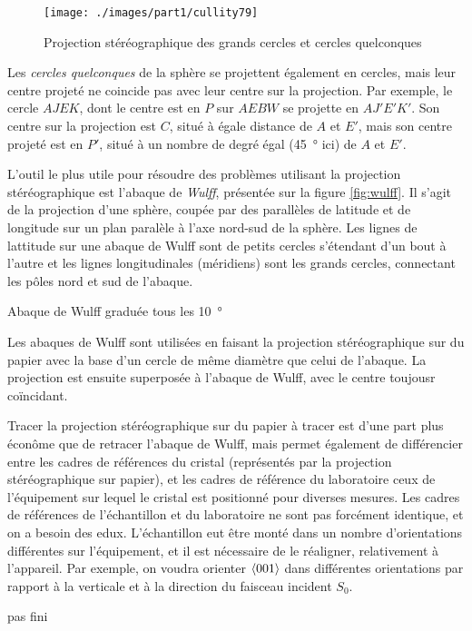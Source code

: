 \begin{figure*}[t]
    \texttt{[image: ./images/part1/cullity79]}
    \caption{Projection stéréographique des grands cercles et cercles quelconques}
    \label{fig:stereocercles}
\end{figure*}

Les \emph{cercles quelconques} de la sphère se projettent également en cercles, mais leur centre projeté ne coincide pas avec leur centre sur la projection. Par exemple, le cercle $AJEK$, dont le centre est en $P$ sur $AEBW$ se projette en $AJ'E'K'$. Son centre sur la projection est $C$, situé à égale distance de $A$ et $E'$, mais son centre projeté est en $P'$, situé à un nombre de degré égal (\SI{45}{\degree} ici) de $A$ et $E'$.

L'outil le plus utile pour résoudre des problèmes utilisant la projection stéréographique est l'abaque de \emph{Wulff}, présentée sur la figure \ref{fig:wulff}. Il s'agit de la projection d'une sphère, coupée par des parallèles de latitude et de longitude sur un plan paralèle à l'axe nord-sud de la sphère. Les lignes de lattitude sur une abaque de Wulff sont de petits cercles s'étendant d'un bout à l'autre et les lignes longitudinales (méridiens) sont les grands cercles, connectant les pôles nord et sud de l'abaque.

\begin{marginfigure}
    \TODO
    \caption{Abaque de Wulff graduée tous les \SI{10}{\degree}}
    \label{fig:wulff}
\end{marginfigure}

Les abaques de Wulff sont utilisées en faisant la projection stéréographique sur du papier avec la base d'un cercle de même diamètre que celui de l'abaque. La projection est ensuite superposée à l'abaque de Wulff, avec le centre toujousr coïncidant.

Tracer la projection stéréographique sur du papier à tracer est d'une part plus éconôme que de retracer l'abaque de Wulff, mais permet également de différencier entre les cadres de références du cristal (représentés par la projection stéréographique sur papier), et les cadres de référence du laboratoire \ie ceux de l'équipement sur lequel le cristal est positionné pour diverses mesures. Les cadres de références de l'échantillon et du laboratoire ne sont pas forcément identique, et on a besoin des edux. L'échantillon eut être monté dans un nombre d'orientations différentes sur l'équipement, et il est nécessaire de le réaligner, relativement à l'appareil. Par exemple, on voudra orienter $\left< 001 \right>$ dans différentes orientations par rapport à la verticale et à la direction du faisceau incident $S_0$.

\TODO pas fini

